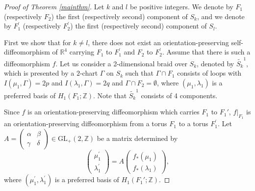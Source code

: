 \documentclass[a4paper,11pt]{amsart}
\numberwithin{equation}{section}
\begin{document}
\begin{proof}[Proof of Theorem \ref{mainthm}]
\begin{sloppypar}
Let $k$ and $l$ be positive integers. 
We denote by $F_1$ (respectively $F_2$) the first (respectively second) component of $S_k$, and 
we denote by $F_1^\prime$ (respectively $F_2^\prime$) the first (respectively second) component of $S_l$. 

First we show that for $k\neq l$, there does not exist an orientation-preserving self-diffeomorphism of $\mathbb{R}^4$ carrying $F_1$ to $F_1^\prime$ and $F_2$ to $F_2^\prime$. Assume that there is such a diffeomorphism $f$. 
Let us consider a 2-dimensional braid over $S_k$, denoted by $\widetilde{S_k}^1$, which is presented by a $2$-chart $\Gamma$ on $S_k$ such that $\Gamma \cap F_1$ consists of loops with $I(\mu_1, \Gamma)=2p$ and $I(\lambda_1, \Gamma)=2q$ and $\Gamma \cap F_2=\emptyset$,  where $(\mu_1, \lambda_1)$ is a preferred basis of $H_1(F_1; \mathbb{Z})$. Note that $\widetilde{S_k}^1$ consists of 4 components.    
 
Since $f$ is an orientation-preserving diffeomorphism which carries $F_1$ to $F_1'$, $f |_{F_1}$ is an orientation-preserving diffeomorphism from a torus $F_1$ to a torus $F_1^\prime$. Let $A=\begin{pmatrix} \alpha & \beta \\ \gamma & \delta \end{pmatrix} \in \mathrm{GL}_+(2,  \mathbb{Z})$ be a matrix determined by  
\begin{equation}\label{0323-1}
\begin{pmatrix} \mu_1^\prime \\ \lambda_1^\prime \end{pmatrix}=A\begin{pmatrix} f_*(\mu_1) \\ f_*(\lambda_1) \end{pmatrix},
\end{equation}
where $(\mu_1^\prime, \lambda_1^\prime)$ is a preferred basis of $H_1(F_1'; \mathbb{Z})$. 


\end{sloppypar}
\end{proof}
\end{document}
